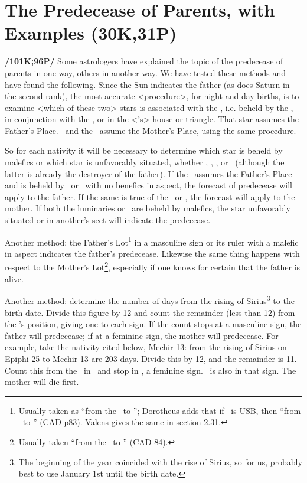 \section{The Predecease of Parents, with Examples (30K,31P)}

\textbf{/101K;96P/} Some astrologers have explained the topic of the predecease of parents in one way, others in another
way. We have tested these methods and have found the following. Since the Sun indicates the father (as does Saturn in the second rank), the most accurate <procedure>, for night and day births, is to examine
<which of these two> stars is associated  with the \Moon, i.e. beheld by the \Moon, in conjunction with the \Moon, or in the <\Moon’s> house or triangle. That star assumes the Father’s Place. \Venus\, and the \Moon\, assume the Mother’s Place, using the same procedure. 

So for each nativity it will be necessary to determine which star is beheld by malefics or which star is unfavorably situated, whether \Sun, \Moon, \Venus, or \Saturn\, (although the latter is already the destroyer of the father). If the \Sun\, assumes the Father’s Place and is beheld by \Mars\, or \Saturn\, with no benefics in aspect, the forecast of predecease will apply to the father. If the same is true of the \Moon\, or \Venus, the forecast will apply to the mother. If both the luminaries or \Venus\, are beheld by malefics, the star unfavorably situated or in another’s sect will indicate the predecease.

Another method: the Father’s Lot\footnote{Usually taken as ``from the \Sun\, to \Saturn''; Dorotheus adds that if \Saturn\, is USB, then ``from \Mars\, to \Jupiter'' (CAD p83). Valens gives the same in section 2.31.} in a masculine sign or its ruler with a malefic in aspect indicates the father’s predecease. Likewise the same thing happens with respect to the Mother’s Lot\footnote{Usually taken ``from the \Moon\, to \Venus'' (CAD 84).}, especially if one knows for certain that the father is alive.

Another method: determine the number of days from the rising of Sirius\footnote{The beginning of the year coincided with the rise of Sirius, so for us, probably best to use January 1st until the birth date.} to the birth date. Divide this figure by 12 and count the remainder (less than 12) from the \Moon’s position, giving one to each sign. If the count stops at a masculine sign, the father will predecease; if at a feminine sign, the mother will
predecease. For example, take the nativity cited below, Mechir 13: from the rising of Sirius on Epiphi 25 to Mechir 13 are 203 days. Divide this by 12, and the remainder is 11. Count this from the \Moon\, in \Scorpio\, and stop in \Virgo, a feminine sign. \Mars\, is also in that sign. The mother will die first.

